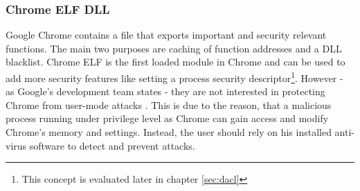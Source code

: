 \subsubsection{Chrome ELF DLL}
Google Chrome contains a  file that exports  important and security relevant functions. The main two purposes are  caching of function addresses and a DLL blacklist. Chrome ELF is the first loaded module in Chrome and can be used to add more security features like setting a process security descriptor\footnote{This concept is evaluated later in chapter \ref{sec:dacl}}. However - as Google's development team states - they are not interested in protecting Chrome from user-mode attacks \cite{chromium_security}. This is due to the reason, that a malicious process running under privilege level as Chrome can gain access and modify Chrome's memory and settings. Instead, the user should rely on his installed anti-virus software to detect and prevent attacks.